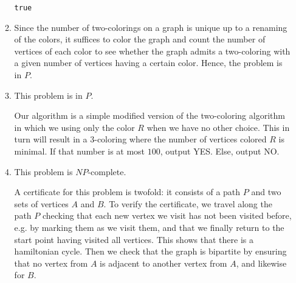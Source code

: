 \documentclass[letterpaper,11pt]{article}
\begin{document}
\begin{enumerate}
\begin{enumerate}
\begin{algorithm}[ht]
\begin{algorithmic}
                        \State \Return \texttt{true}
                    \end{algorithmic}
                \end{algorithm}
                
            \item
                Since the number of two-colorings on a graph is unique up to
                a renaming of the colors, it suffices to color the graph and
                count the number of vertices of each color to see whether the
                graph admits a two-coloring with a given number of vertices
                having a certain color. Hence, the problem is in $P$.

            \item
                This problem is in $P$.

                Our algorithm is a simple modified version of the two-coloring
                algorithm in which we using only the color $R$ when we have no
                other choice. This in turn will result in a $3$-coloring where
                the number of vertices colored $R$ is minimal. If that number
                is at most $100$, output YES. Else, output NO.

            \item
                This problem is $NP$-complete.

                A certificate for this problem is twofold: it consists of a
                path $P$ and two sets of vertices $A$ and $B$. To verify the
                certificate, we travel along the path $P$ checking that each
                new vertex we visit has not been visited before, e.g. by
                marking them as we visit them, and that we finally return to
                the start point having visited all vertices. This shows that
                there is a hamiltonian cycle. Then we check that the graph is
                bipartite by ensuring that no vertex from $A$ is adjacent to
                another vertex from $A$, and likewise for $B$.


\end{enumerate}
\end{enumerate}
\end{document}
